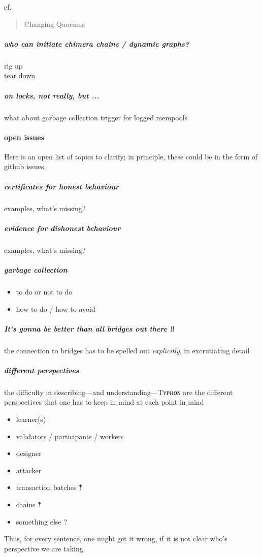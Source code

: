 \documentclass{article}
\theoremstyle{definition}
\begin{document}
cf.
\begin{quote}
   Changing Quorums
\end{quote}

\subparagraph{who can initiate chimera chains / dynamic graphs?}
\begin{description}
\item[rig up] 
\item[tear down] 
\end{description}

\subparagraph{%
  on locks, not really, but ... 
}
what about garbage collection trigger 
for logged mempools




\paragraph{open issues}
Here is an open list of topics to clarify;
in principle, 
these could be in the form of github issues. 

\subparagraph{certificates for honest behaviour}
examples, what's missing?

\subparagraph{evidence for dishonest behaviour}
examples, what's missing?

\subparagraph{garbage collection}
\begin{itemize}
\item to do or not to do
\item how to do / how to avoid 
\end{itemize}

\subparagraph{It's gonna be better than all bridges out there ‼}
the connection to bridges has to be spelled out \emph{explicitly},
in excrutiating detail

\subparagraph{different perspectives}
the difficulty in describing---and understanding---Tʏᴘʜᴏɴ
are the different perspectives that one has to keep in mind at each point in mind
\begin{itemize}
\item learner(s)
\item validators / participants / workers
\item designer
\item attacker
\item transaction batches ‽
\item chains ‽
\item something else ?
\end{itemize}
Thus, for every sentence, 
one might get it wrong,
if it is not clear who's perspective we are taking. 
\end{document}
